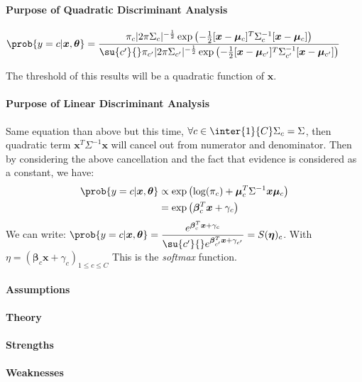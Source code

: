 \paragraph{Purpose of Quadratic Discriminant Analysis}
\begin{center}
    $\prob{y=c|\bm{x},\bm{\theta}} = \dfrac{\pi_{c}|2\pi\Sigma_{c}|^{
    -\frac{1}{2}}\exp\left(-\frac{1}{2}[\bm{x}-\bm{\mu}_{c}]^{T}\Sigma_{
    c}^{-1}[\bm{x}-\bm{\mu}_{c}]\right)}{\su{c'}{}\pi_{c'}|2\pi\Sigma_{
    c'}|^{-\frac{1}{2}}\exp\left(-\frac{1}{2}[\bm{x}-\bm{\mu}_{c'}]^{T}
    \Sigma_{c'}^{-1}[\bm{x}-\bm{\mu}_{c'}]\right)}$
\end{center}
The threshold of this results will be a quadratic function of $\bm{x}$.

\paragraph{Purpose of Linear Discriminant Analysis}
Same equation than above but this time, $\forall c\in \inter{1}{C} 
\Sigma_{c} = \Sigma$, then quadratic term $\bm{x}^{T}\Sigma^{-1}\bm{x}$ 
will cancel out from numerator and denominator.
Then by considering the above cancellation and the fact that 
evidence is considered as a constant, we have:
\begin{align*}
    \prob{y=c|\bm{x},\bm{\theta}} & \propto \exp\left(\log(\pi_{c})+\bm{
        \mu}_{c}^{T}\Sigma^{-1}\bm{x}\bm{\mu}_{c}\right)\\
    &= \exp\left(\bm{\beta}_{c}^{T}\bm{x} + \gamma_{c}\right)
\end{align*}
We can write: $\prob{y=c|\bm{x},\bm{\theta}} = \dfrac{e^{\bm{\beta}_{c
}^{T}\bm{x} + \gamma_{c}}}{\su{c'}{}e^{\bm{\beta}_{c'}^{T}\bm{x} + 
\gamma_{c'}}} = S(\bm{\eta})_{c}$. With $\eta=\left(\bm{\beta}_{c}\bm{x}
+\gamma_{c}\right)_{1\leq c\leq C}$
This is the \emph{softmax} function.


\paragraph{Assumptions}
\paragraph{Theory}
\paragraph{Strengths}
\paragraph{Weaknesses}
